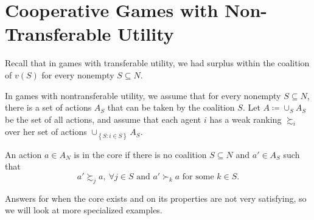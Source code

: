 \section{Cooperative Games with Non-Transferable Utility}

Recall that in games with transferable utility, we had surplus within the coalition of $v(S)$ for every nonempty $S \subseteq N$.

In games with nontransferable utility, we assume that for every nonempty $S \subseteq N$, there is a set of actions $A_S$ that can be taken by the coalition $S$. Let $A \coloneqq \cup_S A_S$ be the set of all actions, and assume that each agent $i$ has a weak ranking $\succsim_i$ over her set of actions $\cup_{\left\{S : i \in S\right\}}A_S$.

\begin{definition}[Core]
	An action $a \in A_N$ is in the core if there is no coalition $S \subseteq N$ and $a' \in A_S$ such that \[
		a' \succsim_j a, \ \forall j \in S \text{ and } a' \succ_k a \text{ for some }k \in S
	.\] 
\end{definition}

Answers for when the core exists and on its properties are not very satisfying, so we will look at more specialized examples.
